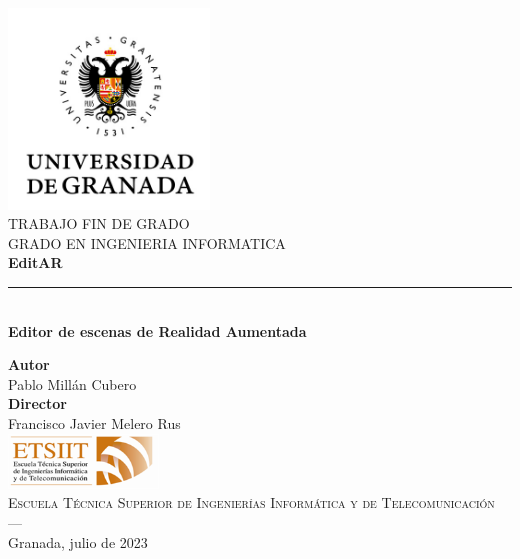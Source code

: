 \begin{titlepage}
\newlength{\centeroffset}
\setlength{\centeroffset}{-0.5\oddsidemargin}
\addtolength{\centeroffset}{0.5\evensidemargin}
\thispagestyle{empty}

\noindent\hspace*{\centeroffset}\begin{minipage}{\textwidth}

\centering
\includegraphics[width=0.40\textwidth]{logos/logo_ugr.jpg}\\[0.3cm]

\textsc{ \Large TRABAJO FIN DE GRADO\\[0.2cm]}
\textsc{ GRADO EN INGENIERIA INFORMATICA}\\[1cm]

{\Huge\bfseries EditAR \\}
\noindent\rule[-1ex]{\textwidth}{3pt}\\[3.5ex]
{\large\bfseries Editor de escenas de Realidad Aumentada }
\end{minipage}

\vspace{2.5cm}
\noindent\hspace*{\centeroffset}
\begin{minipage}{\textwidth}
\centering

\textbf{Autor}\\ {Pablo Millán Cubero}\\[2.5ex]
\textbf{Director}\\ {Francisco Javier Melero Rus}\\[2cm]
\includegraphics[width=0.3\textwidth]{logos/etsiit_logo.png}\\[0.1cm]
\textsc{Escuela Técnica Superior de Ingenierías Informática y de Telecomunicación}\\
\textsc{---}\\
Granada, julio de 2023
\end{minipage}
\end{titlepage}
